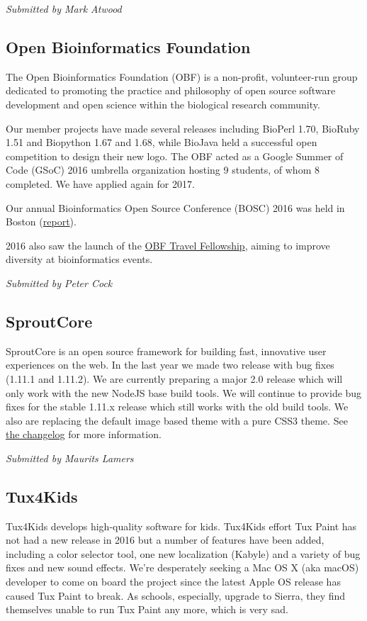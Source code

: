 \documentclass[letterpaper]{report}
\begin{document}
{\em Submitted by Mark Atwood}

\subsection{Open Bioinformatics Foundation}

The Open Bioinformatics Foundation (OBF) is a non-profit, volunteer-run
group dedicated to promoting the practice and philosophy of open source
software development and open science within the biological research
community.

Our member projects have made several releases including BioPerl 1.70,
BioRuby 1.51 and Biopython 1.67 and 1.68, while BioJava held a
successful open competition to design their new logo. The OBF acted as a
Google Summer of Code (GSoC) 2016 umbrella organization hosting 9
students, of whom 8 completed. We have applied again for 2017.

Our annual Bioinformatics Open Source Conference (BOSC) 2016 was held in
Boston (\href{http://dx.doi.org/10.12688/f1000research.9663.1}{report}).

2016 also saw the launch of the
\href{https://news.open-bio.org/2016/03/01/obf-travel-fellowship-program/}{OBF
Travel Fellowship}, aiming to improve diversity at bioinformatics
events.

{\em Submitted by Peter Cock}

\subsection{SproutCore}

SproutCore is an open source framework for building fast, innovative
user experiences on the web. In the last year we made two release with
bug fixes (1.11.1 and 1.11.2). We are currently preparing a major 2.0
release which will only work with the new NodeJS base build tools. We
will continue to provide bug fixes for the stable 1.11.x release which
still works with the old build tools. We also are replacing the default
image based theme with a pure CSS3 theme.  See
\href{https://github.com/sproutcore/sproutcore/blob/master/CHANGELOG.md}{the
changelog} for more information.

{\em Submitted by Maurits Lamers}

\subsection{Tux4Kids}

Tux4Kids develops high-quality software for kids.  Tux4Kids effort Tux
Paint has not had a new release in 2016 but a number of features have
been added, including a color selector tool, one new localization
(Kabyle) and a variety of bug fixes and new sound effects.  We're
desperately seeking a Mac OS X (aka macOS) developer to come on board
the project since the latest Apple OS release has caused Tux Paint to
break.  As schools, especially, upgrade to Sierra, they find themselves
unable to run Tux Paint any more, which is very sad.
\end{document}
